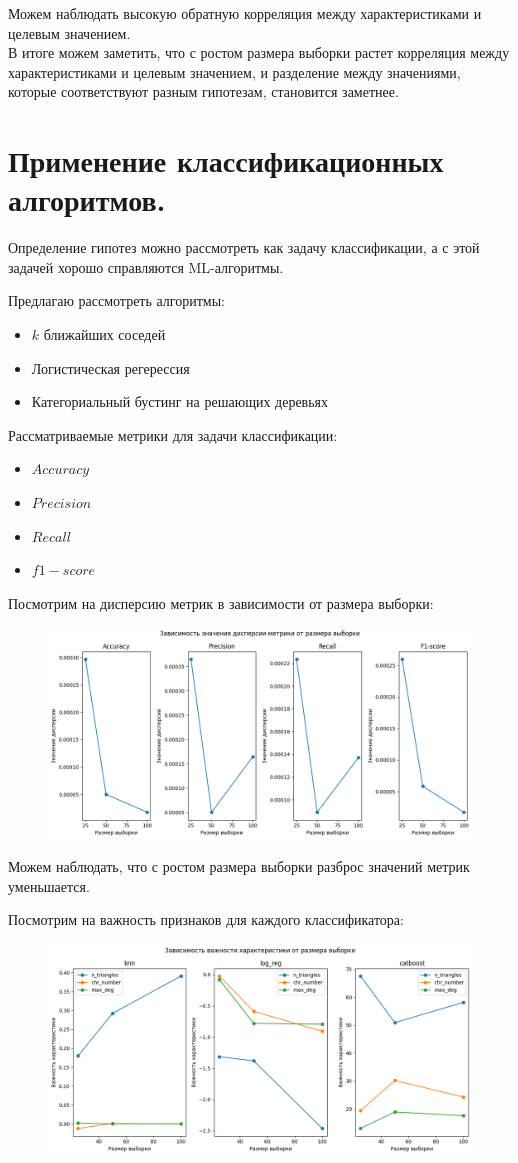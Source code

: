 \documentclass{report}
\begin{document}
Можем наблюдать высокую обратную корреляция между характеристиками и целевым значением.\\

В итоге можем заметить, что с ростом размера выборки растет корреляция между характеристиками и целевым значением, и разделение между значениями, которые соответствуют разным гипотезам, становится заметнее.
\newpage
\section{Применение классификационных алгоритмов.}

Определение гипотез можно рассмотреть как задачу классификации, а с этой задачей хорошо справляются ML-алгоритмы. 

Предлагаю рассмотреть алгоритмы:
\begin{itemize}
    \item $k$ ближайших соседей
    \item Логистическая регерессия
    \item Категориальный бустинг на решающих деревьях
\end{itemize}

Рассматриваемые метрики для задачи классификации:
\begin{itemize}
    \item $Accuracy$
    \item $Precision$
    \item $Recall$
    \item $f1-score$
\end{itemize}

Посмотрим на дисперсию метрик в зависимости от размера выборки:
\begin{figure}[h]
    \centering
    \includegraphics[width=0.5\linewidth]{metrics_var.png}
\end{figure}

Можем наблюдать, что с ростом размера выборки разброс значений метрик уменьшается.

Посмотрим на важность признаков для каждого классификатора:
\begin{figure}[h]
    \centering
    \includegraphics[width=0.5\linewidth]{char_imp.png}
\end{figure}
\end{document}
